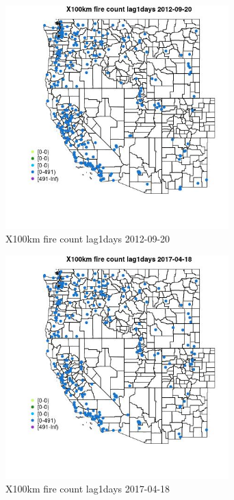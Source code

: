\begin{figure} 
\centering  
\includegraphics[width=0.77\textwidth]{Code_Outputs/Report_ML_input_PM25_Step4_part_e_de_duplicated_aves_compiled_2019-05-14wNAs_MapObsX100km_fire_count_lag1days2012-09-20.jpg} 
\caption{\label{fig:Report_ML_input_PM25_Step4_part_e_de_duplicated_aves_compiled_2019-05-14wNAsMapObsX100km_fire_count_lag1days2012-09-20}X100km fire count lag1days 2012-09-20} 
\end{figure} 
 

\begin{figure} 
\centering  
\includegraphics[width=0.77\textwidth]{Code_Outputs/Report_ML_input_PM25_Step4_part_e_de_duplicated_aves_compiled_2019-05-14wNAs_MapObsX100km_fire_count_lag1days2017-04-18.jpg} 
\caption{\label{fig:Report_ML_input_PM25_Step4_part_e_de_duplicated_aves_compiled_2019-05-14wNAsMapObsX100km_fire_count_lag1days2017-04-18}X100km fire count lag1days 2017-04-18} 
\end{figure} 
 

